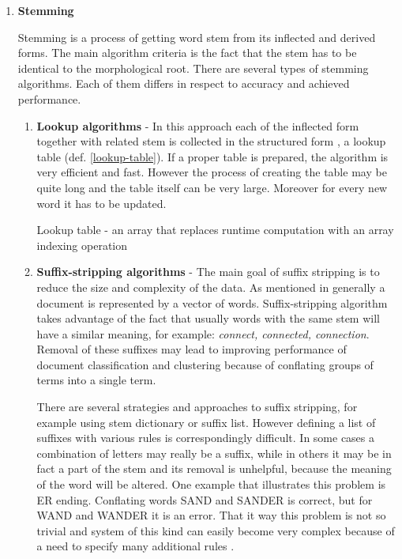 \begin{enumerate}

\item	\textbf{Stemming}
	
	Stemming is a process of getting word stem from its inflected and derived forms. The main algorithm criteria is the fact that the stem has to be identical to the morphological root. There are several types of stemming algorithms. Each of them differs in respect to accuracy and achieved performance.
	
	\begin{enumerate}
		\item \textbf{Lookup algorithms} - In this approach each of the inflected form together with related stem is collected in the structured form  \cite{lookup-stem}, a lookup table (def. \ref{lookup-table}). If a proper table is prepared, the algorithm is very efficient and fast. However the process of creating the table may be quite long and the table itself can be very large. Moreover for every new word it has to be updated. 
		
		 \begin{definition}
		 	\label{lookup-table}
		 	Lookup table - an array that replaces runtime computation with an array indexing operation
		 	
		 \end{definition}
	
		
		\item \textbf{Suffix-stripping algorithms} - The main goal of suffix stripping is to reduce the size and complexity of the data. As mentioned in \cite{suffix-stripping} generally a document is represented by a vector of words. Suffix-stripping algorithm takes advantage of the fact that usually words with the same stem will have a similar meaning, for example: \textit{connect, connected, connection}. Removal of these suffixes may lead to improving performance of document classification and clustering because of conflating groups of terms into a single term. 
		
		There are several strategies and approaches to suffix stripping, for example using stem dictionary or suffix list. However defining a list of suffixes with various rules is correspondingly difficult. In some cases a combination of letters may really be a suffix, while in others it may be in fact a part of the stem and its removal is unhelpful, because the meaning of the word will be altered. One example that illustrates this problem is ER ending. Conflating words SAND and SANDER is correct, but for WAND and WANDER it is an error. 
		That it way this problem is not so trivial and system of this kind can easily become very complex because of a need to specify many additional rules \cite{suffix-stripping}.
 


\end{enumerate}
\end{enumerate}
